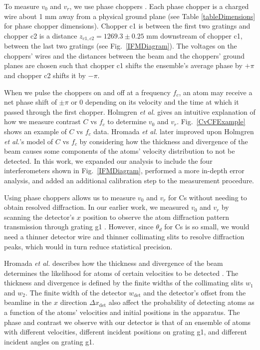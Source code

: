 \documentclass[twocolumn,prl,showpacs,superscriptaddress]{revtex4-1}   %
\newcommand{\figref}[1]{Fig.~\ref{#1}}
\newcommand{\etal}{\textit{et al.}}
\newcommand{\etalspace}{\textit{et al. }}
\begin{document}
To measure $v_0$ and $v_r$, we use phase choppers \cite{Holmgren2011,Hromada2014}. Each phase chopper is a charged wire about 1 mm away from a physical ground plane (see Table \ref{tableDimensions} for phase chopper dimensions). Chopper c1 is between the first two gratings and chopper c2 is a distance $z_{c1,c2} = 1269.3 \pm 0.25$ mm downstream of chopper c1, between the last two gratings (see \figref{IFMDiagram}). The voltages on the choppers' wires and the distances between the beam and the choppers' ground planes are chosen such that chopper c1 shifts the ensemble's average phase by $+\pi$ and chopper c2 shifts it by $-\pi$. 

When we pulse the choppers on and off at a frequency $f_c$, an atom may receive a net phase shift of $\pm\pi$ or $0$ depending on its velocity and the time at which it passed through the first chopper. 
Holmgren \etalspace \cite{Holmgren2011} gives an intuitive explanation of how
we measure contrast $C$ vs $f_c$ to determine $v_0$ and $v_r$. \figref{CvCFExample} shows an example of $C$ vs $f_c$ data. Hromada \etalspace \cite{Hromada2014} later improved upon Holmgren \etal's model of $C$ vs $f_c$ by considering how the thickness and divergence of the beam causes some components of the atoms' velocity distribution to not be detected. In this work,
we expanded our analysis to include the four interferometers shown in \figref{IFMDiagram}, performed a more in-depth error analysis,
and added an additional calibration step to the measurement procedure.

Using phase choppers allows us to measure $v_0$ and $v_r$ for Cs without needing to obtain resolved diffraction. In our earlier work, we measured $v_0$ and $v_r$ by scanning the detector's $x$ position to observe the atom diffraction pattern transmission through grating g1 \cite{Holmgren2010}. However, since $\theta_d$ for Cs is so small, we would need a thinner detector wire and thinner collimating slits to resolve diffraction peaks, which would in turn reduce statistical precision.

Hromada \etalspace describes how the thickness and divergence of the beam determines the likelihood for atoms of certain velocities to be detected \cite{Hromada2014}.
The thickness and divergence is defined by the finite widths of the collimating slits $w_1$ and $w_2$. The finite width of the detector $w_{\mathrm{det}}$ and the detector's offset from the beamline in the $x$ direction $\Delta x_{\mathrm{det}}$ also 
affect the probability of detecting atoms as a function of the atoms' velocities and initial positions in the apparatus.
The phase and contrast we observe with our detector is that of an ensemble of atoms with different velocities, different incident positions on grating g1, and different incident angles on grating g1.
\end{document}
